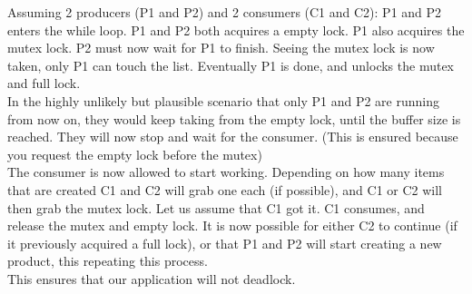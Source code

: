 Assuming 2 producers (P1 and P2) and 2 consumers (C1 and C2):
P1 and P2 enters the while loop. P1 and P2 both acquires a empty lock. P1 also acquires the mutex lock. P2 must now wait for P1 to finish.
Seeing the mutex lock is now taken, only P1 can touch the list. Eventually P1 is done, and unlocks the mutex and full lock. \\

In the highly unlikely but plausible scenario that only P1 and P2 are running from now on, they would keep taking from the empty lock, until the buffer size is reached. They will now stop and wait for the consumer. (This is ensured because you request the empty lock before the mutex)\\

The consumer is now allowed to start working. Depending on how many items that are created C1 and C2 will grab one each (if possible), and C1 or C2 will then grab the mutex lock. Let us assume that C1 got it.
C1 consumes, and release the mutex and empty lock. 
It is now possible for either C2 to continue (if it previously acquired a full lock), or that P1 and P2 will start creating a new product, this repeating this process. \\

This ensures that our application will not deadlock.